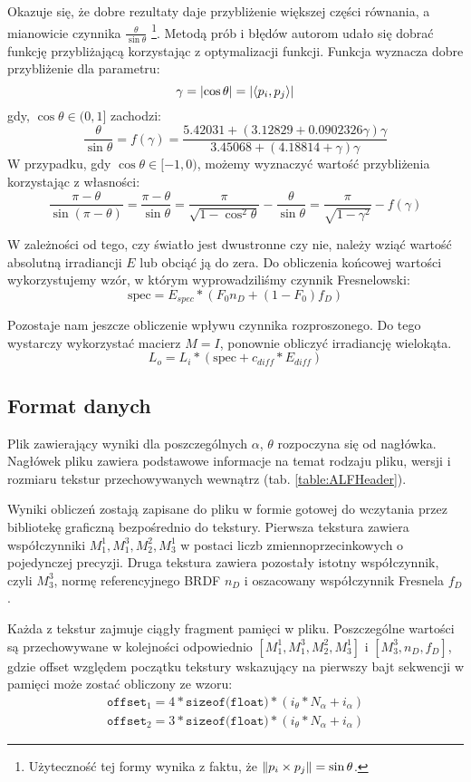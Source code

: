 \documentclass[../main.tex]{subfiles}
\begin{document}
Okazuje się, że dobre rezultaty daje przybliżenie większej części równania, a mianowicie czynnika $\frac{\theta}{\sin\theta}$ \footnote{Użyteczność tej formy wynika z faktu, że $\norm{p_i \times p_j} = \sin\theta$.}. Metodą prób i błędów autorom udało się dobrać funkcję przybliżającą korzystając z optymalizacji funkcji. Funkcja wyznacza dobre przybliżenie dla parametru:
\[
\gamma = \abs{\cos\theta} = \abs{\langle p_i, p_j \rangle}
\]
\noindent gdy, $\cos\theta \in (0,1]$ zachodzi:
\[
\frac{\theta}{\sin\theta} = f(\gamma) = \frac{
    5.42031 + \left( 3.12829 + 0.0902326 \gamma \right) \gamma
}{
    3.45068 + \left( 4.18814 + \gamma \right) \gamma
}
\]
\noindent W przypadku, gdy $\cos\theta \in [-1, 0)$, możemy wyznaczyć wartość przybliżenia korzystając z własności:
\[
    \frac{\pi - \theta}{\sin\left( \pi-\theta \right)} =
    \frac{\pi - \theta}{\sin\theta} = 
    \frac{\pi}{\sqrt{1-\cos^{2}\theta}} - \frac{\theta}{\sin\theta} =
    \frac{\pi}{\sqrt{1-\gamma^2}} - f(\gamma)
\]

W zależności od tego, czy światło jest dwustronne czy nie, należy wziąć wartość absolutną irradiancji $E$ lub obciąć ją do zera. Do obliczenia końcowej wartości wykorzystujemy wzór, w którym wyprowadziliśmy czynnik Fresnelowski:
\[
    \text{spec} = E_{spec} * (F_0 n_D + (1-F_0) f_D)
\]

Pozostaje nam jeszcze obliczenie wpływu czynnika rozproszonego. Do tego wystarczy wykorzystać macierz $M=I$, ponownie obliczyć irradiancję wielokąta. 
\[
    L_o = L_i * \left( \text{spec} + c_{diff}*E_{diff} \right)
\]

\subsection{Format danych}

Plik zawierający wyniki dla poszczególnych $\alpha$, $\theta$ rozpoczyna się od nagłówka. Nagłówek pliku zawiera podstawowe informacje na temat rodzaju pliku, wersji i rozmiaru tekstur przechowywanych wewnątrz (tab. \ref{table:ALFHeader}).

Wyniki obliczeń zostają zapisane do pliku w formie gotowej do wczytania przez bibliotekę graficzną bezpośrednio do tekstury. Pierwsza tekstura zawiera współczynniki $M_{1}^{1}, M_{1}^{3}, M_{2}^{2}, M_{3}^{1}$ w postaci liczb zmiennoprzecinkowych o pojedynczej precyzji. Druga tekstura zawiera pozostały istotny współczynnik, czyli $M_{3}^{3}$, normę referencyjnego BRDF $n_D$ i oszacowany współczynnik Fresnela $f_D$.

Każda z tekstur zajmuje ciągły fragment pamięci w pliku. Poszczególne wartości są przechowywane w kolejności odpowiednio $[M_{1}^{1}, M_{1}^{3}, M_{2}^{2}, M_{3}^{1}]$ i $[M_{3}^{3}, n_D, f_D]$, gdzie offset względem początku tekstury wskazujący na pierwszy bajt sekwencji w pamięci może zostać obliczony ze wzoru:
\begin{gather*}
\texttt{offset}_1 = 4 * \texttt{sizeof(float)} * \left(
i_{\theta} * N_{\alpha} + i_{\alpha}
\right) \\
\texttt{offset}_2 = 3 * \texttt{sizeof(float)} * \left(
i_{\theta} * N_{\alpha} + i_{\alpha}
\right)
\end{gather*}
\end{document}
